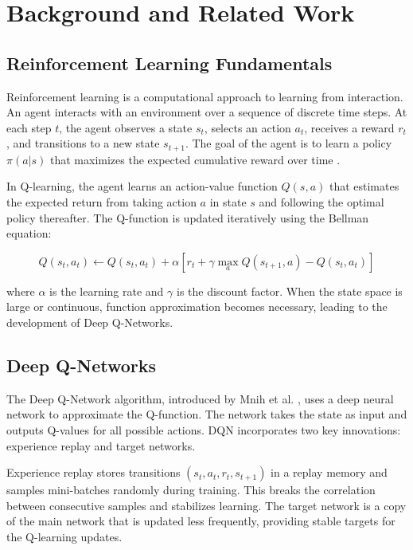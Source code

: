 \documentclass[conference]{IEEEtran}
\begin{document}
\section{Background and Related Work}
\label{sec:background}

\subsection{Reinforcement Learning Fundamentals}
Reinforcement learning is a computational approach to learning from interaction. An agent interacts with an environment over a sequence of discrete time steps. At each step $t$, the agent observes a state $s_t$, selects an action $a_t$, receives a reward $r_t$, and transitions to a new state $s_{t+1}$. The goal of the agent is to learn a policy $\pi(a|s)$ that maximizes the expected cumulative reward over time \cite{sutton2018reinforcement}.

In Q-learning, the agent learns an action-value function $Q(s,a)$ that estimates the expected return from taking action $a$ in state $s$ and following the optimal policy thereafter. The Q-function is updated iteratively using the Bellman equation:

\begin{equation}
Q(s_t, a_t) \leftarrow Q(s_t, a_t) + \alpha [r_t + \gamma \max_{a} Q(s_{t+1}, a) - Q(s_t, a_t)]
\end{equation}

where $\alpha$ is the learning rate and $\gamma$ is the discount factor. When the state space is large or continuous, function approximation becomes necessary, leading to the development of Deep Q-Networks.

\subsection{Deep Q-Networks}
The Deep Q-Network algorithm, introduced by Mnih et al. \cite{mnih2015human}, uses a deep neural network to approximate the Q-function. The network takes the state as input and outputs Q-values for all possible actions. DQN incorporates two key innovations: experience replay and target networks.

Experience replay stores transitions $(s_t, a_t, r_t, s_{t+1})$ in a replay memory and samples mini-batches randomly during training. This breaks the correlation between consecutive samples and stabilizes learning. The target network is a copy of the main network that is updated less frequently, providing stable targets for the Q-learning updates.
\end{document}
